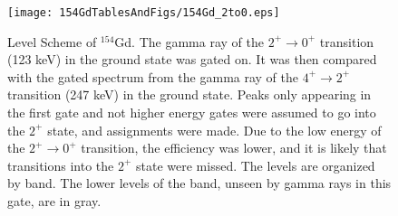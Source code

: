 \begin{landscape}
\begin{figure}[!]
    \centering
    \texttt{[image: 154GdTablesAndFigs/154Gd\_2to0.eps]}
    \caption{Level Scheme of $^{154}$Gd. The gamma ray of the $2^+\rightarrow0^+$ transition (123 keV) in the ground state was gated on. It was then compared with the gated spectrum from the gamma ray of the $4^+\rightarrow2^+$ transition (247 keV) in the ground state. Peaks only appearing in the first gate and not higher energy gates were assumed to go into the $2^+$ state, and assignments were made. Due to the low energy of the $2^+\rightarrow0^+$ transition, the efficiency was lower, and it is likely that transitions into the $2^+$ state were missed. The levels are organized by band. The lower levels of the band, unseen by gamma rays in this gate, are in gray.}
    \label{fig:154_2to0}
\end{figure}
\end{landscape}